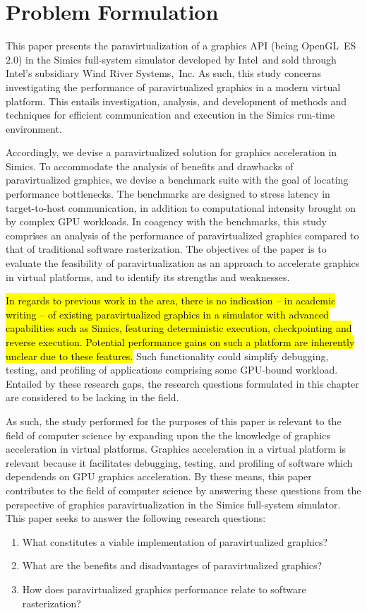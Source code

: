 
\section{Problem Formulation}
\label{sec:problemformulation}
This paper presents the paravirtualization of a graphics API (being OpenGL~ES~$2.0$) in the Simics full-system simulator developed by Intel\circledR\ and sold through Intel\circledR 's subsidiary Wind River Systems,~Inc. 
As such, this study concerns investigating the performance of paravirtualized graphics in a modern virtual platform.
This entails investigation, analysis, and development of methods and techniques for efficient communication and execution in the Simics run-time environment.

Accordingly, we devise a paravirtualized solution for graphics acceleration in Simics.
To accommodate the analysis of benefits and drawbacks of paravirtualized graphics, we devise a benchmark suite with the goal of locating performance bottlenecks.
The benchmarks are designed to stress latency in target-to-host communication, in addition to computational intensity brought on by complex GPU workloads.
In coagency with the benchmarks, this study comprises an analysis of the performance of paravirtualized graphics compared to that of traditional software rasterization.
The objectives of the paper is to evaluate the feasibility of paravirtualization as an approach to accelerate graphics in virtual platforms, and to identify its strengths and weaknesses.

\hl{In regards to previous work in the area, there is no indication -- in academic writing -- of existing paravirtualized graphics in a simulator with advanced capabilities such as Simics, featuring deterministic execution, checkpointing and reverse execution.
Potential performance gains on such a platform are inherently unclear due to these features.}
Such functionality could simplify debugging, testing, and profiling of applications comprising some GPU-bound workload.
Entailed by these research gaps, the research questions formulated in this chapter are considered to be lacking in the field.

As such, the study performed for the purposes of this paper is relevant to the field of computer science by expanding upon the the knowledge of graphics acceleration in virtual platforms. Graphics acceleration in a virtual platform is relevant because it facilitates debugging, testing, and profiling of software which dependends on GPU graphics acceleration.
By these means, this paper contributes to the field of computer science by answering these questions from the perspective of graphics paravirtualization in the Simics full-system simulator.
This paper seeks to answer the following research questions:

\begin{enumerate}
  \item What constitutes a viable implementation of paravirtualized graphics?
  \item What are the benefits and disadvantages of paravirtualized graphics?
  \item How does paravirtualized graphics performance relate to software rasterization?
\end{enumerate}
